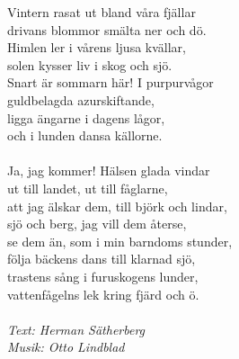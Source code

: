 \vspace{10pt}
Vintern rasat ut bland våra fjällar\\
drivans blommor smälta ner och dö.\\
Himlen ler i vårens ljusa kvällar,\\
solen kysser liv i skog och sjö.\\
Snart är sommarn här! I purpurvågor \\
guldbelagda azurskiftande,\\
ligga ängarne i dagens lågor,\\
och i lunden dansa källorne.\\
\\
Ja, jag kommer! Hälsen glada vindar\\
ut till landet, ut till fåglarne,\\
att jag älskar dem, till björk och lindar,\\
sjö och berg, jag vill dem återse,\\
se dem än, som i min barndoms stunder,\\
följa bäckens dans till klarnad sjö,\\
trastens sång i furuskogens lunder,\\
vattenfågelns lek kring fjärd och ö.\\
\\
{\footnotesize\textit{Text: Herman Sätherberg\\ Musik: Otto Lindblad}}
